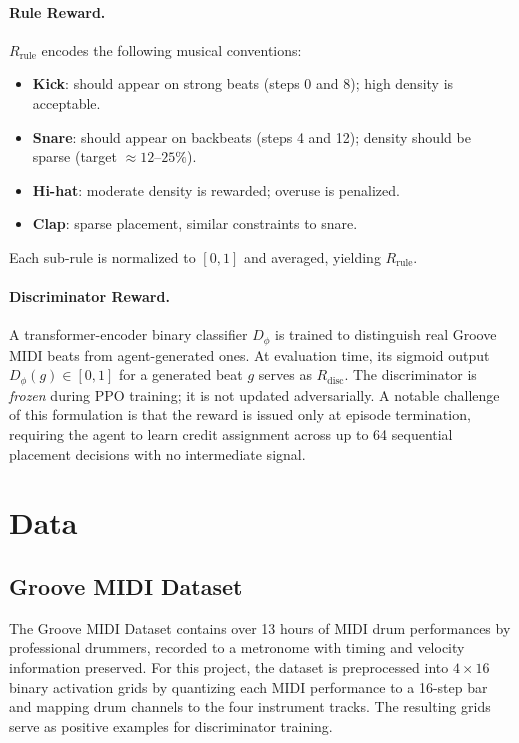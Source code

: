\documentclass[11pt]{article}
\begin{document}
\paragraph{Rule Reward.} $R_{\text{rule}}$ encodes the following musical conventions:
\begin{itemize}[nosep]
    \item \textbf{Kick}: should appear on strong beats (steps 0 and 8); high density is acceptable.
    \item \textbf{Snare}: should appear on backbeats (steps 4 and 12); density should be sparse (target $\approx 12$--$25\%$).
    \item \textbf{Hi-hat}: moderate density is rewarded; overuse is penalized.
    \item \textbf{Clap}: sparse placement, similar constraints to snare.
\end{itemize}
Each sub-rule is normalized to $[0, 1]$ and averaged, yielding $R_{\text{rule}}$.

\paragraph{Discriminator Reward.} A transformer-encoder binary classifier $D_\phi$ is trained to distinguish real Groove MIDI beats from agent-generated ones. At evaluation time, its sigmoid output $D_\phi(g) \in [0, 1]$ for a generated beat $g$ serves as $R_{\text{disc}}$. The discriminator is \textit{frozen} during PPO training; it is not updated adversarially. A notable challenge of this formulation is that the reward is issued only at episode termination, requiring the agent to learn credit assignment across up to 64 sequential placement decisions with no intermediate signal.

\section{Data}

\subsection{Groove MIDI Dataset}

The Groove MIDI Dataset \cite{groove2019} contains over 13 hours of MIDI drum performances by professional drummers, recorded to a metronome with timing and velocity information preserved. For this project, the dataset is preprocessed into $4 \times 16$ binary activation grids by quantizing each MIDI performance to a 16-step bar and mapping drum channels to the four instrument tracks. The resulting grids serve as positive examples for discriminator training.
\end{document}
